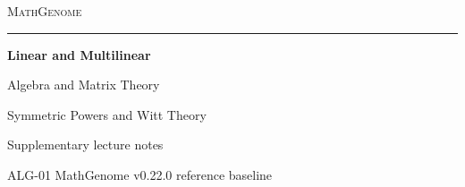 \documentclass[11pt,oneside,openany]{book}
\theoremstyle{definition}
\theoremstyle{remark}
\begin{document}
\frontmatter
\hypersetup{pageanchor=false}
\begin{titlepage}
  \thispagestyle{empty}
  \begin{flushleft}
    \vspace*{0.65in}
    {\large\scshape\color{deepgreen}MathGenome\par}
    \vspace{0.32in}
    {\color{rulegreen}\rule{0.94\textwidth}{0.65pt}\par}
    \vspace{0.45in}
    {\color{ink}\fontsize{34}{39}\selectfont\bfseries
       Linear and Multilinear\par Algebra and Matrix Theory\par}
    \vspace{0.30in}
    {\color{deepgreen}\Large
       Symmetric Powers and Witt Theory\par}
    \vfill
    {\large Supplementary lecture notes\par}
    \vspace{0.12in}
    {\normalsize ALG-01 \enspace\textperiodcentered\enspace MathGenome v0.22.0 reference baseline\par}
    \vspace*{0.48in}
  \end{flushleft}
\end{titlepage}
\hypersetup{pageanchor=true}
{\small\tableofcontents}


\mainmatter


\end{document}

